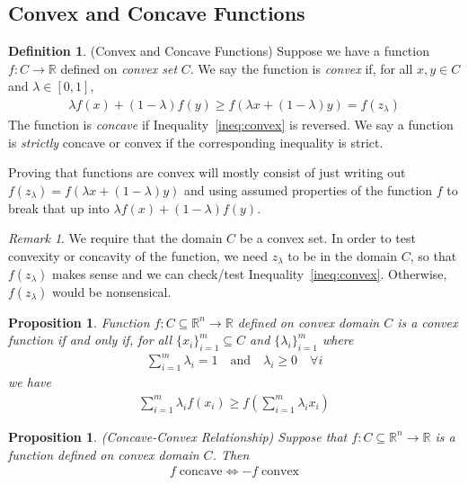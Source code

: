 \documentclass[12pt]{article}
\numberwithin{equation}{section} %
\theoremstyle{plain}
\newtheorem{prop}[thm]{Proposition}
\theoremstyle{definition}
\newtheorem{defn}[thm]{Definition}
\theoremstyle{remark}
\newtheorem*{rmk}{Remark}
\newcommand{\R}{\mathbb{R}}
\newcommand{\Rn}{\mathbb{R}^n}
\begin{document}
\subsection{Convex and Concave Functions}

\begin{defn}{(Convex and Concave Functions)}
Suppose we have a function $f:C\rightarrow \R$ defined on \emph{convex
set} $C$. We say the function is \emph{convex} if, for all $x,y\in C$
and $\lambda \in[0,1]$,
\begin{align}
  \label{ineq:convex}
  \lambda f(x) + (1-\lambda) f(y) \geq f(\lambda x + (1-\lambda)y) =
  f(z_\lambda)
\end{align}
The function is \emph{concave} if Inequality~\ref{ineq:convex} is
reversed. We say a function is \emph{strictly} concave or convex if the
corresponding inequality is strict.

Proving that functions are convex will mostly consist of just writing
out $f(z_\lambda) = f(\lambda x + (1-\lambda)y)$ and using assumed
properties of the function $f$ to break that up into $\lambda f(x) +
(1-\lambda)f(y)$.
\end{defn}
\begin{rmk}
We require that the domain $C$ be a convex set.  In order to test
convexity or concavity of the function, we need $z_\lambda$ to be in the
domain $C$, so that $f(z_\lambda)$ makes sense and we can check/test
Inequality~\ref{ineq:convex}. Otherwise, $f(z_\lambda)$ would be
nonsensical.
\end{rmk}

\begin{prop}
Function $f:C\subseteq\Rn\rightarrow \R$ defined on convex domain $C$ is
a convex function if and only if, for all $\{x_i\}_{i=1}^m\subseteq C$
and $\{\lambda_i\}_{i=1}^m$ where
\begin{align*}
  \sum^{m}_{i=1} \lambda_i = 1
  \quad \text{and} \quad \lambda_i \geq 0 \quad \forall i
\end{align*}
we have
\begin{align*}
  \sum^m_{i=1} \lambda_i f(x_i)
  \geq
  f\left(\sum^m_{i=1} \lambda_i x_i\right)
\end{align*}
\end{prop}

\begin{prop}{\emph{(Concave-Convex Relationship)}}
Suppose that $f:C\subseteq\Rn\rightarrow \R$ is a function defined on
convex domain $C$. Then
\begin{align*}
  f \; \text{concave}
  \iff
  -f \; \text{convex}
\end{align*}
\end{prop}
\end{document}
